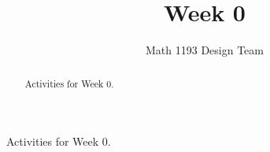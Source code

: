\documentclass[noauthor]{ximera}
\title{Week 0}
\author{Math 1193 Design Team}
\begin{document}
\begin{abstract}
    Activities for Week 0.
\end{abstract}
\maketitle

Activities for Week 0.
\end{document}
